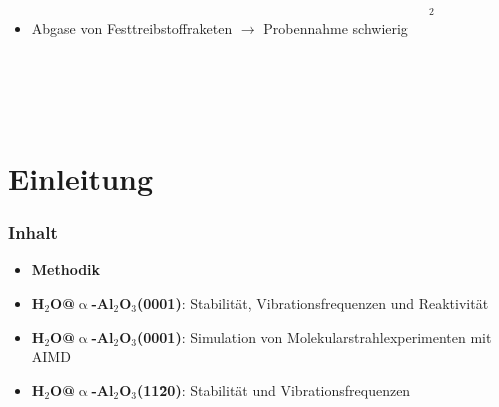 \documentclass[hyperref={pdfpagelabels=false}]{beamer}
\begin{document}
\begin{frame}[plain]
\begin{columns}[c]
\begin{itemize}
   \item Abgase von Festtreibstoffraketen $\rightarrow$ Probennahme schwierig
  \end{itemize}
   \tiny{$^2$} %
 \end{columns}
 ~\\
 \pause
 \\
\end{frame}

\section[]{Einleitung}
\begin{frame}[plain]
\frametitle{Inhalt}
\begin{itemize}
 \item \textbf{Methodik}
 \item \textbf{H$_2$O@$\upalpha$-Al$_2$O$_3$(0001)}: Stabilität, Vibrationsfrequenzen und Reaktivität
 \item \textbf{H$_2$O@$\upalpha$-Al$_2$O$_3$(0001)}: Simulation von Molekularstrahlexperimenten mit AIMD
 \item \textbf{H$_2$O@$\upalpha$-Al$_2$O$_3$(11\=20)}: Stabilität und Vibrationsfrequenzen
 \end{itemize}
\end{frame}
\end{document}
